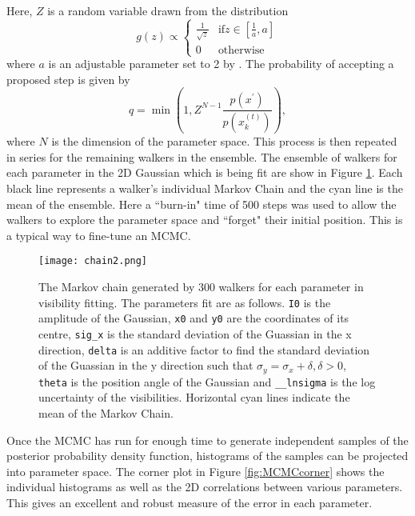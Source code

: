 Here, $Z$ is a random variable drawn from the distribution
\begin{equation}
\label{eq:MCMC_g}
g(z) \propto 
\begin{cases}
\frac{1}{\sqrt{z}} & \mbox{if} z \in \left[\frac{1}{a}, a \right] \\
0 & \mbox{otherwise}
\end{cases}
\end{equation}
where $a$ is an adjustable parameter set to 2 by \cite{Goodman2010}. The probability of accepting a proposed step is given by
\begin{equation}
\label{eq:MCMC_stretch_newstate}
q = \min \left(1, Z^{N-1} \frac{p(x^\prime)}{p(x_k^{(t)})}\right),
\end{equation} 
where $N$ is the dimension of the parameter space. This process is then repeated in series for the remaining walkers in the ensemble.
The ensemble of walkers for each parameter in the 2D Gaussian which is being fit are show in Figure \ref{fig:MCMCchain}. Each black line represents a walker's individual Markov Chain and the cyan line is the mean of the ensemble. Here a ``burn-in" time of 500 steps was used to allow the walkers to explore the parameter space and ``forget" their initial position. This is a typical way to fine-tune an MCMC. 
\begin{figure}
\centering
\texttt{[image: chain2.png]}
\caption[The Markov chain generated by 300 walkers for each parameter in visibility fitting.]{The Markov chain generated by 300 walkers for each parameter in visibility fitting. The parameters fit are as follows. \texttt{I0} is the amplitude of the Gaussian, \texttt{x0} and \texttt{y0} are the coordinates of its centre, \texttt{sig\_x} is the standard deviation of the Guassian in the x direction, \texttt{delta} is an additive factor to find the standard deviation of the Guassian in the y direction such that $\sigma_y = \sigma_x + \delta, \delta > 0$, \texttt{theta} is the position angle of the Gaussian and \texttt{\_\_lnsigma} is the log uncertainty of the visibilities. Horizontal cyan lines indicate the mean of the Markov Chain.}
\label{fig:MCMCchain}
\end{figure}

Once the MCMC has run for enough time to generate independent samples of the posterior probability density function, histograms of the samples can be projected into parameter space. The corner plot in Figure \ref{fig:MCMCcorner} shows the individual histograms as well as the 2D correlations between various parameters. This gives an excellent and robust measure of the error in each parameter.

